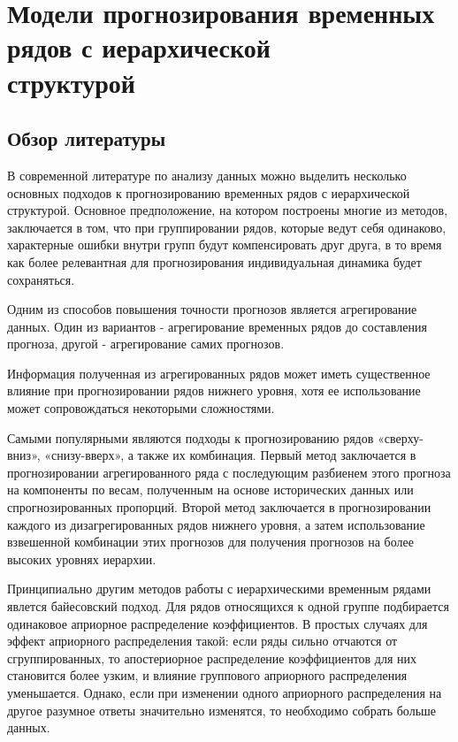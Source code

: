 \documentclass[12pt,a4paper, oneside]{extreport}
\begin{document}






\chapter{Модели прогнозирования временных рядов  с иерархической \\ структурой}



\section{Обзор литературы}


В современной  литературе по анализу данных можно выделить несколько основных подходов к  прогнозированию временных рядов с иерархической структурой. 
Основное предположение, на котором построены многие из методов, заключается в том, что при группировании рядов, которые ведут себя одинаково, характерные ошибки внутри групп будут  компенсировать друг друга, в то время как более релевантная для прогнозирования  индивидуальная динамика будет сохраняться.

Одним из способов повышения точности прогнозов является агрегирование данных. Один из вариантов - агрегирование временных рядов до составления прогноза, другой - агрегирование самих прогнозов. 

Информация полученная из агрегированных рядов может иметь существенное влияние при прогнозировании рядов нижнего уровня, хотя ее использование может сопровождаться некоторыми сложностями. 


Самыми популярными  являются   подходы к прогнозированию рядов  «сверху-вниз», «снизу-вверх», а также их комбинация. Первый метод заключается в прогнозировании  агрегированного  ряда с последующим разбиенем этого прогноза на компоненты по весам, полученным  на основе исторических данных  или спрогнозированных  пропорций. Второй метод заключается в прогнозировании каждого из дизагрегированных рядов нижнего уровня, а затем использование взвешенной комбинации этих прогнозов  для получения прогнозов на более высоких уровнях иерархии. 


Принципиально другим методов работы с иерархическими временным рядами явлется байесовский подход. Для рядов относящихся к одной группе подбирается одинаковое априорное распределение коэффициентов.
В простых случаях для эффект априорного распределения  такой: если ряды сильно отчаются от сгруппированных, то   апостериорное распределение коэффициентов для них 
становится более узким, и влияние группового априорного распределения уменьшается.
Однако, если при  изменении одного априорного распределения на другое разумное ответы значительно изменятся, то необходимо собрать больше данных.
\end{document}
